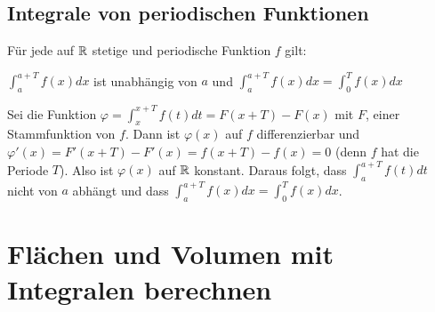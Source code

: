 \subsection{Integrale von periodischen Funktionen}
\begin{Theorem}
  Für jede auf $\mathbb{R}$ stetige und periodische Funktion $f$ gilt:
  \begin{center}
  \( \displaystyle\int_a^{a+T} f(x)dx\) ist unabhängig von $a$ und \( \displaystyle\int_a^{a+T} f(x)dx = \int_0^{T} f(x)dx\)
  \end{center}
\end{Theorem}
\begin{Beweis}
  Sei die Funktion $\varphi = \displaystyle{\int_x^{x+T} f(t)dt}=F(x+T)-F(x)$ mit $F$, einer Stammfunktion von $f$. Dann ist
  $\varphi(x)$ auf $f$ differenzierbar und $\varphi'(x)=F'(x+T)-F'(x) = f(x+T)-f(x)=0$ (denn $f$ hat die Periode $T$). Also ist $\varphi(x)$ auf $\mathbb{R}$ konstant. Daraus folgt, dass $\displaystyle{\int_a^{a+T}f(t)dt}$ nicht von $a$ abhängt und dass $\displaystyle{\int_a^{a+T} f(x)dx = \int_0^{T} f(x)dx}$.
\end{Beweis}


\section{Flächen und Volumen mit Integralen berechnen}

